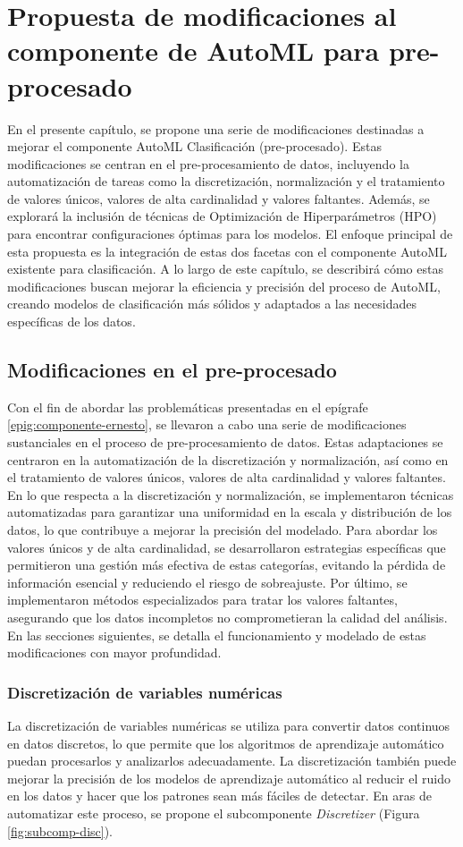 \chapter{Propuesta de modificaciones al componente de AutoML para pre-procesado}\label{chap:2}
En el presente capítulo, se propone una serie de modificaciones destinadas a mejorar el componente AutoML Clasificación (pre-procesado). Estas modificaciones se centran en el pre-procesamiento de datos, incluyendo la automatización de tareas como la discretización, normalización y el tratamiento de valores únicos, valores de alta cardinalidad y valores faltantes. Además, se explorará la inclusión de técnicas de Optimización de Hiperparámetros (HPO) para encontrar configuraciones óptimas para los modelos. El enfoque principal de esta propuesta es la integración de estas dos facetas con el componente AutoML existente para clasificación. A lo largo de este capítulo, se describirá cómo estas modificaciones buscan mejorar la eficiencia y precisión del proceso de AutoML, creando modelos de clasificación más sólidos y adaptados a las necesidades específicas de los datos.

\section{Modificaciones en el pre-procesado}
Con el fin de abordar las problemáticas presentadas en el epígrafe \ref{epig:componente-ernesto}, se llevaron a cabo una serie de modificaciones sustanciales en el proceso de pre-procesamiento de datos. Estas adaptaciones se centraron en la automatización de la discretización y normalización, así como en el tratamiento de valores únicos, valores de alta cardinalidad y valores faltantes. En lo que respecta a la discretización y normalización, se implementaron técnicas automatizadas para garantizar una uniformidad en la escala y distribución de los datos, lo que contribuye a mejorar la precisión del modelado. Para abordar los valores únicos y de alta cardinalidad, se desarrollaron estrategias específicas que permitieron una gestión más efectiva de estas categorías, evitando la pérdida de información esencial y reduciendo el riesgo de sobreajuste. Por último, se implementaron métodos especializados para tratar los valores faltantes, asegurando que los datos incompletos no comprometieran la calidad del análisis. En las secciones siguientes, se detalla el funcionamiento y modelado de estas modificaciones con mayor profundidad.


\subsection{Discretización de variables numéricas} 
La discretización de variables numéricas se utiliza para convertir datos continuos en datos discretos, lo que permite que los algoritmos de aprendizaje automático puedan procesarlos y analizarlos adecuadamente. La discretización también puede mejorar la precisión de los modelos de aprendizaje automático al reducir el ruido en los datos y hacer que los patrones sean más fáciles de detectar. En aras de automatizar este proceso, se propone el subcomponente \textit{Discretizer} (Figura \ref{fig:subcomp-disc}).

